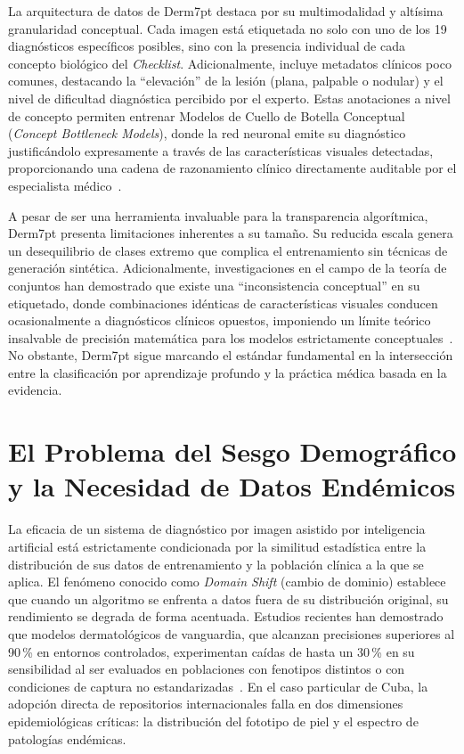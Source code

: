 La arquitectura de datos de Derm7pt destaca por su multimodalidad y altísima granularidad conceptual. Cada 
imagen está etiquetada no solo con uno de los 19 diagnósticos específicos posibles, sino con la presencia 
individual de cada concepto biológico del \textit{Checklist}. Adicionalmente, incluye metadatos clínicos poco 
comunes, destacando la ``elevación'' de la lesión (plana, palpable o nodular) y el nivel de dificultad 
diagnóstica percibido por el experto. Estas anotaciones a nivel de concepto permiten entrenar Modelos de 
Cuello de Botella Conceptual (\textit{Concept Bottleneck Models}), donde la red neuronal emite su diagnóstico 
justificándolo expresamente a través de las características visuales detectadas, proporcionando una cadena de 
razonamiento clínico directamente auditable por el especialista médico~\cite{arxiv_derm7pt_concept}.

A pesar de ser una herramienta invaluable para la transparencia algorítmica, Derm7pt presenta limitaciones 
inherentes a su tamaño. Su reducida escala genera un desequilibrio de clases extremo que complica el 
entrenamiento sin técnicas de generación sintética. Adicionalmente, investigaciones en el campo de la 
teoría de conjuntos han demostrado que existe una ``inconsistencia conceptual'' en su etiquetado, donde 
combinaciones idénticas de características visuales conducen ocasionalmente a diagnósticos clínicos 
opuestos, imponiendo un límite teórico insalvable de precisión matemática para los modelos estrictamente 
conceptuales~\cite{arxiv_derm7pt_concept}. No obstante, Derm7pt sigue marcando el estándar fundamental en 
la intersección entre la clasificación por aprendizaje profundo y la práctica médica basada en la evidencia.


\section{El Problema del Sesgo Demográfico y la Necesidad de Datos Endémicos}\label{sec:sesgo-demografico}

La eficacia de un sistema de diagnóstico por imagen asistido por inteligencia artificial está 
estrictamente condicionada por la similitud estadística entre la distribución de sus datos de 
entrenamiento y la población clínica a la que se aplica. El fenómeno conocido como \textit{Domain Shift} 
(cambio de dominio) establece que cuando un algoritmo se enfrenta a datos fuera de su distribución 
original, su rendimiento se degrada de forma acentuada. Estudios recientes han demostrado que modelos 
dermatológicos de vanguardia, que alcanzan precisiones superiores al 90\,\% en entornos controlados, 
experimentan caídas de hasta un 30\,\% en su sensibilidad al ser evaluados en poblaciones con fenotipos 
distintos o con condiciones de captura no estandarizadas~\cite{sciadv_daneshjou2022,arxiv_kinyanjui2019}. 
En el caso particular de Cuba, la adopción directa de repositorios internacionales falla en dos 
dimensiones epidemiológicas críticas: la distribución del fototipo de piel y el espectro de patologías 
endémicas.


